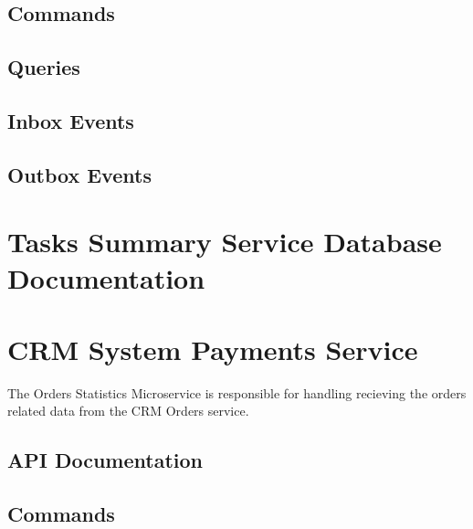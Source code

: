 \documentclass[letterpaper,10pt,english]{sphinxmanual}
\begin{document}
\subsection{Commands}
\label{\detokenize{crm_system/tasks_summary_service:commands}}

\subsection{Queries}
\label{\detokenize{crm_system/tasks_summary_service:queries}}

\subsection{Inbox Events}
\label{\detokenize{crm_system/tasks_summary_service:inbox-events}}

\subsection{Outbox Events}
\label{\detokenize{crm_system/tasks_summary_service:outbox-events}}

\section{Tasks Summary Service Database Documentation}
\label{\detokenize{crm_system/tasks_summary_service:tasks-summary-service-database-documentation}}
\sphinxstepscope


\section{CRM System Payments Service}
\label{\detokenize{crm_system/orders_service:crm-system-payments-service}}\label{\detokenize{crm_system/orders_service::doc}}
\sphinxAtStartPar
The Orders Statistics Microservice is responsible for handling recieving the orders related data from the CRM Orders service.



\subsection{API Documentation}
\label{\detokenize{crm_system/orders_service:api-documentation}}

\subsection{Commands}
\label{\detokenize{crm_system/orders_service:commands}}
\end{document}
